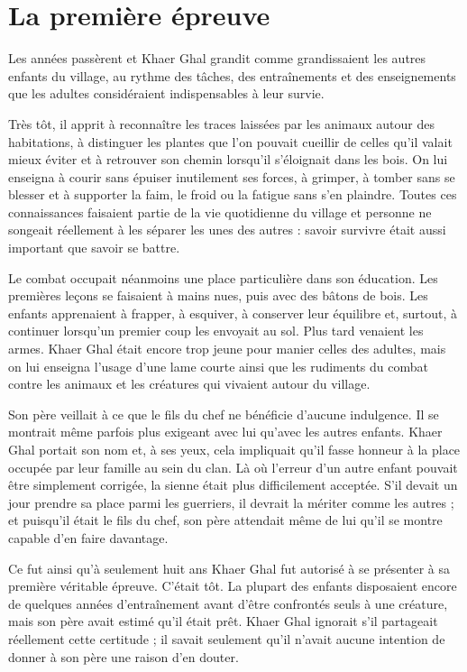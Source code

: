 \chapter{La première épreuve}
\label{chap:premiere-epreuve}

Les années passèrent et Khaer Ghal grandit comme grandissaient les autres
enfants du village, au rythme des tâches, des entraînements et des
enseignements que les adultes considéraient indispensables à leur survie.

Très tôt, il apprit à reconnaître les traces laissées par les animaux autour
des habitations, à distinguer les plantes que l'on pouvait cueillir de celles
qu'il valait mieux éviter et à retrouver son chemin lorsqu'il s'éloignait dans
les bois. On lui enseigna à courir sans épuiser inutilement ses forces, à
grimper, à tomber sans se blesser et à supporter la faim, le froid ou la
fatigue sans s'en plaindre. Toutes ces connaissances faisaient partie de la vie
quotidienne du village et personne ne songeait réellement à les séparer les
unes des autres : savoir survivre était aussi important que savoir se battre.

Le combat occupait néanmoins une place particulière dans son éducation. Les
premières leçons se faisaient à mains nues, puis avec des bâtons de bois. Les
enfants apprenaient à frapper, à esquiver, à conserver leur équilibre et,
surtout, à continuer lorsqu'un premier coup les envoyait au sol. Plus tard
venaient les armes. Khaer Ghal était encore trop jeune pour manier celles des
adultes, mais on lui enseigna l'usage d'une lame courte ainsi que les rudiments
du combat contre les animaux et les créatures qui vivaient autour du village.

Son père veillait à ce que le fils du chef ne bénéficie d'aucune indulgence. Il
se montrait même parfois plus exigeant avec lui qu'avec les autres enfants.
Khaer Ghal portait son nom et, à ses yeux, cela impliquait qu'il fasse honneur
à la place occupée par leur famille au sein du clan. Là où l'erreur d'un autre
enfant pouvait être simplement corrigée, la sienne était plus difficilement
acceptée. S'il devait un jour prendre sa place parmi les guerriers, il devrait
la mériter comme les autres ; et puisqu'il était le fils du chef, son père
attendait même de lui qu'il se montre capable d'en faire davantage.

Ce fut ainsi qu'à seulement huit ans Khaer Ghal fut autorisé à se présenter à
sa première véritable épreuve. C'était tôt. La plupart des enfants disposaient
encore de quelques années d'entraînement avant d'être confrontés seuls à une
créature, mais son père avait estimé qu'il était prêt. Khaer Ghal ignorait s'il
partageait réellement cette certitude ; il savait seulement qu'il n'avait
aucune intention de donner à son père une raison d'en douter.

